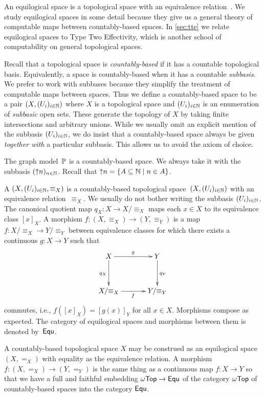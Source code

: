 An equilogical space is a topological space with an
equivalence relation~. We study equilogical spaces
in some detail because they give us a general theory of computable
maps between countably-based spaces. In \cref{sec:tte} we
relate equilogical spaces to Type Two Effectivity, which is another
school of computability on general topological spaces.

Recall that a topological space is \emph{countably-based} if it has a
countable topological basis. Equivalently, a space is countably-based
when it has a countable \emph{subbasis}. We prefer to work with
subbases because they simplify the treatment of computable maps
between spaces. Thus we define a countably-based space to be a pair
$(X, (U_i)_{i \in \mathbb{N}})$ where $X$ is a topological space and
$(U_i)_{i \in \mathbb{N}}$ is an enumeration of \emph{subbasic} open sets.
These generate the topology of $X$ by taking finite intersections and
arbitrary unions. While we usually omit an explicit mention of the
subbasis $(U_i)_{i \in \mathbb{N}}$, we do insist that a countably-based
space always be given \emph{together with} a particular subbasis. This
allows us to avoid the axiom of choice.

The graph model~$\mathbb{P}$ is a countably-based space. We always take it
with the subbasis $({\uparrow}n)_{n \in \mathbb{N}}$. Recall that ${\uparrow}n =
\{A \subseteq \mathbb{N} \mid n \in A\}$.

A  $(X, (U_i)_{i \in \mathbb{N}},
{\equiv_X})$ is a countably-based topological space~$(X, (U_i)_{i \in
  \mathbb{N}})$ with an equivalence relation~$\equiv_X$. We usually do not
bother writing the subbasis $(U_i)_{i \in \mathbb{N}}$. The canonical
quotient map $q_X : X \to X/{\equiv_X}$ maps each $x \in X$ to its
equivalence class $[x]_X$. A morphism $f : (X,{\equiv_X}) \to
(Y,{\equiv_Y})$ is a map $f : X/{\equiv_X} \to Y/{\equiv_Y}$ between
equivalence classes for which there exists a continuous $g : X \to Y$
such that
%
\begin{equation*}
  \xymatrix@+1em{
    {X} \ar[d]_{q_X} \ar[r]^g
    &
    {Y} \ar[d]^{q_Y}
    \\
    {X/{\equiv_X}}
    \ar[r]_f
    &
    {Y/{\equiv_Y}}
  }
\end{equation*}
%
commutes, i.e., $f([x]_X) = [g(x)]_Y$ for all $x \in X$. Morphisms
compose as expected. The category of equilogical spaces and morphisms
between them is denoted by~$\mathsf{Equ}$.

A countably-based topological space $X$ may be construed as an
equilogical space $(X, {=_X})$ with equality as the equivalence
relation. A morphism $f : (X, {=_X}) \to (Y, {=_Y})$ is the same
thing as a continuous map $f : X \to Y$ so that we have a full and
faithful embedding $\mathsf{\omega Top} \to \mathsf{Equ}$ of the category $\mathsf{\omega Top}$ of
countably-based spaces into the category $\mathsf{Equ}$.


